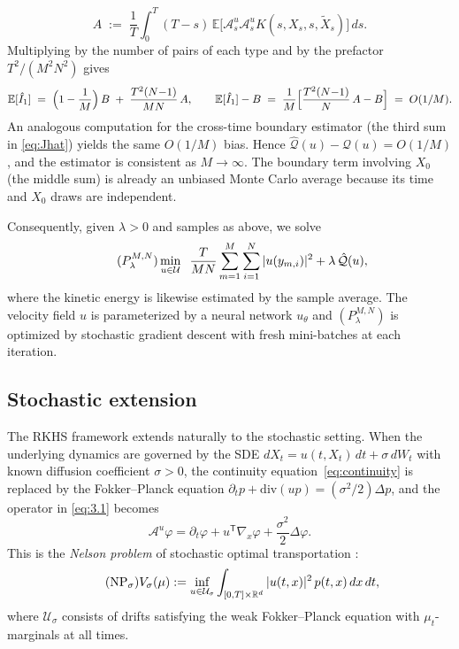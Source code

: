 \documentclass[11pt,leqno]{article}
\theoremstyle{plain}
\theoremstyle{remark}
\theoremstyle{definition}
\numberwithin{equation}{section}
\numberwithin{figure}{section}
\numberwithin{table}{section}
\begin{document}
\[
 A\;:=\;\frac{1}{T}\int_0^T\!(T-s)\,
 \mathbb{E}\bigl[\mathcal{A}^u_s\mathcal{A}^u_s K(s,X_s,s,\tilde X_s)\bigr]\,ds.
\]
Multiplying by the number of pairs of each type and by the prefactor
$T^2/(M^2N^2)$ gives
\[
 \mathbb{E}[\hat I_1]
 \;=\;\Bigl(1-\frac{1}{M}\Bigr)\,B
 \;+\;\frac{T^2(N{-}1)}{MN}\,A,
 \qquad
 \mathbb{E}[\hat I_1]-B
 \;=\;\frac{1}{M}\Bigl[\frac{T^2(N{-}1)}{N}\,A - B\Bigr]
 \;=\;O(1/M).
\]
An analogous computation for the cross-time boundary estimator (the
third sum in \eqref{eq:Jhat}) yields the same $O(1/M)$ bias.  Hence
$\hat{\mathcal Q}(u)-\mathcal Q(u)=O(1/M)$, and the estimator is
consistent as $M\to\infty$.  The boundary term involving $X_0$ (the
middle sum) is already an unbiased Monte Carlo average because its
time and $X_0$ draws are independent.


Consequently, given $\lambda>0$ and samples as above, we solve
\begin{equation}
\tag{$P_{\lambda}^{M,N}$}\label{eq:PlambdaMN}
 \min_{u\in\mathcal{U}}\;\;
 \frac{T}{MN}\sum_{m=1}^M\sum_{i=1}^N|u(y_{m,i})|^2
 + \lambda\,\hat{\mathcal{Q}}(u),
\end{equation}
where the kinetic energy is likewise estimated by the sample average.
The velocity field $u$ is parameterized by a neural network $u_\theta$ and $(P_{\lambda}^{M,N})$ is optimized by stochastic gradient descent with fresh mini-batches at each iteration.


\subsection{Stochastic extension}
\label{sec:stochastic}

The RKHS framework extends naturally to the stochastic setting.
When the underlying dynamics are governed by the SDE
$dX_t = u(t,X_t)\,dt + \sigma\,dW_t$ with known diffusion coefficient
$\sigma>0$, the continuity equation~\eqref{eq:continuity} is replaced by the
Fokker--Planck equation
$\partial_t p + \mathrm{div}(up) = (\sigma^2/2)\Delta p$,
and the operator in \eqref{eq:3.1} becomes
\begin{equation}\label{eq:Au-sigma}
 \mathcal{A}^u\varphi
 = \partial_t\varphi + u^{\mathsf{T}}\nabla_x\varphi
   + \frac{\sigma^2}{2}\Delta\varphi.
\end{equation}
This is the \emph{Nelson problem} of stochastic optimal transportation
\cite{Nelson1985,Mikami1990,Mikami2021}:
\begin{equation}
\tag{$\mathrm{NP}_\sigma$}
   V_\sigma(\mu)
  := \inf_{u\in\mathcal{U}_\sigma}
     \int_{[0,T]\times\mathbb{R}^d} |u(t,x)|^2\,p(t,x)\,dx\,dt,
\end{equation}
where $\mathcal{U}_\sigma$ consists of drifts satisfying the weak
Fokker--Planck equation with $\mu_t$-marginals at all times.
\end{document}
